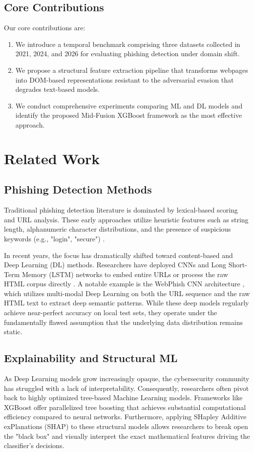 \documentclass[conference]{IEEEtran}
\begin{document}
\subsection{Core Contributions}
Our core contributions are:
\begin{enumerate}
    \item We introduce a temporal benchmark comprising three datasets collected in 2021, 2024, and 2026 for evaluating phishing detection under domain shift.
    \item We propose a structural feature extraction pipeline that transforms webpages into DOM-based representations resistant to the adversarial evasion that degrades text-based models.
    \item We conduct comprehensive experiments comparing ML and DL models and identify the proposed Mid-Fusion XGBoost framework as the most effective approach.
\end{enumerate}

\section{Related Work}

\subsection{Phishing Detection Methods}
Traditional phishing detection literature is dominated by lexical-based scoring and URL analysis. These early approaches utilize heuristic features such as string length, alphanumeric character distributions, and the presence of suspicious keywords (e.g., "login", "secure") \cite{look_before_leap}. 

In recent years, the focus has dramatically shifted toward content-based and Deep Learning (DL) methods. Researchers have deployed CNNs and Long Short-Term Memory (LSTM) networks to embed entire URLs or process the raw HTML corpus directly \cite{dl_framework_phishing}. A notable example is the WebPhish CNN architecture \cite{web_phishing_dl}, which utilizes multi-modal Deep Learning on both the URL sequence and the raw HTML text to extract deep semantic patterns. While these deep models regularly achieve near-perfect accuracy on local test sets, they operate under the fundamentally flawed assumption that the underlying data distribution remains static. 

\subsection{Explainability and Structural ML}
As Deep Learning models grow increasingly opaque, the cybersecurity community has struggled with a lack of interpretability. Consequently, researchers often pivot back to highly optimized tree-based Machine Learning models. Frameworks like XGBoost \cite{xgboost} offer parallelized tree boosting that achieves substantial computational efficiency compared to neural networks. Furthermore, applying SHapley Additive exPlanations (SHAP) \cite{shap} to these structural models allows researchers to break open the "black box" and visually interpret the exact mathematical features driving the classifier's decisions.
\end{document}
